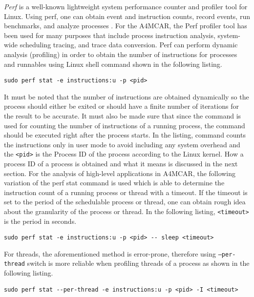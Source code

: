 \textit{Perf} \cite{perf1} \cite{perf2} is a well-known lightweight system performance counter and profiler tool for Linux. Using perf, one can obtain event and instruction counts, record events, run benchmarks, and analyze processes \cite{perf1}. For the A4MCAR, the Perf profiler tool has been used for many purposes that include process instruction analysis, system-wide scheduling tracing, and trace data conversion. Perf can perform dynamic analysis (profiling) in order to obtain the number of instructions for processes and runnables using Linux shell command shown in the following listing. 
\begin{lstlisting}[style=bash]
sudo perf stat -e instructions:u -p <pid>
\end{lstlisting}
It must be noted that the number of instructions are obtained dynamically so the process should either be exited or should have a finite number of iterations for the result to be accurate. It must also be made sure that since the command is used for counting the number of instructions of a running process, the command should be executed right after the process starts. In the listing, command counts the instructions only in user mode to avoid including any system overhead and the \texttt{<pid>} is the Process ID of the process according to the Linux kernel. How a process ID of a process is obtained and what it means is discussed in the next section.
For the analysis of high-level applications in A4MCAR, the following variation of the perf stat command is used which is able to determine the instruction count of a running process or thread with a timeout. If the timeout is set to the period of the schedulable process or thread, one can obtain rough idea about the granularity of the process or thread. In the following listing, \texttt{<timeout>} is the period in seconds.
\begin{lstlisting}[style=bash]
sudo perf stat -e instructions:u -p <pid> -- sleep <timeout>
\end{lstlisting}
For threads, the aforementioned method is error-prone, therefore using \texttt{--per-thread} switch is more reliable when profiling threads of a process as shown in the following listing.
\begin{lstlisting}[style=bash]
sudo perf stat --per-thread -e instructions:u -p <pid> -I <timeout>
\end{lstlisting}

